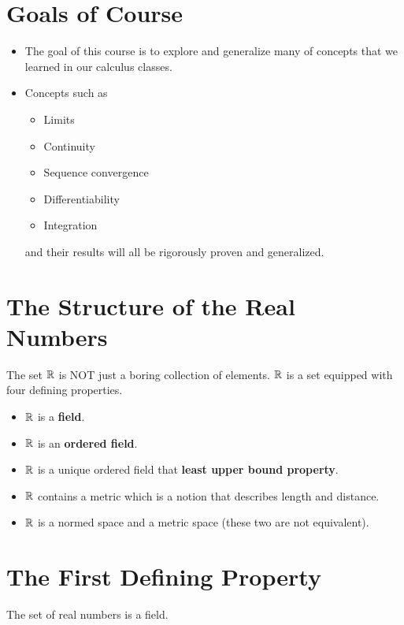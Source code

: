 \documentclass[a4paper]{article}
\begin{document}
\section{Goals of Course}
\begin{itemize}
    \item The goal of this course is to explore and generalize many of concepts that we learned in our calculus classes. 
    \item Concepts such as
        \begin{itemize}
            \item Limits 
            \item Continuity
            \item Sequence convergence 
            \item Differentiability
            \item Integration
        \end{itemize}
        and their results will all be rigorously proven and generalized. 
\end{itemize}

\section{The Structure of the Real Numbers}


The set \( \mathbb{R}  \) is NOT just a boring collection of elements. \( \mathbb{R}  \) is a set equipped with four defining properties.

\begin{itemize}
    \item \( \mathbb{R}  \) is a \textbf{field}.
    \item \( \mathbb{R}  \) is an \textbf{ordered field}. 
    \item \( \mathbb{R}  \) is a unique ordered field that \textbf{least upper bound property}.
    \item \( \mathbb{R}  \) contains a metric which is a notion that describes length and distance. 
    \item \( \mathbb{R}  \) is a normed space and a metric space (these two are not equivalent).
\end{itemize}


\section{The First Defining Property}

The set of real numbers is a field.
\end{document}
